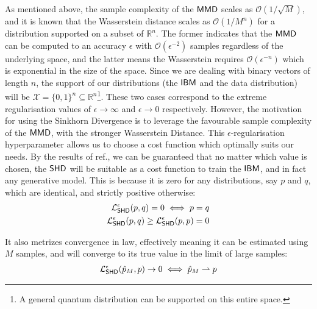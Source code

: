 As mentioned above, the sample complexity of the $\operatorname{\textsf{MMD}}$ scales as $\mathcal{O}(1/\sqrt{M})$, and it is known that the Wasserstein distance scales as $\mathcal{O}(1/M^n)$  for a distribution supported on a subset of $\mathbb{R}^n$. The former indicates that the $\operatorname{\textsf{MMD}}$ can be computed to an accuracy $\epsilon$ with $\mathcal{O}(\epsilon^{-2})$ samples regardless of the underlying space, and the latter means the Wasserstein requires $\mathcal{O}(\epsilon^{-n})$ which is exponential in the size of the space. Since we are dealing with binary vectors of length $n$, the support of our distributions (the $\textsf{IBM}$ and the data distribution) will be $\mathcal{X} = \{0, 1\}^n \subseteq \mathbb{R}^n$\footnote{A general quantum distribution can be supported on this entire space.}. These two cases correspond to the extreme regularisation values of $\epsilon \rightarrow \infty$ and $\epsilon \rightarrow 0$ respectively. However, the motivation for using the Sinkhorn Divergence is to leverage the favourable sample complexity of the $\operatorname{\textsf{MMD}}$, with the stronger Wasserstein Distance. This $\epsilon$-regularisation hyperparameter allows us to choose a cost function which optimally suits our needs. By the results of ref., we can be guaranteed that no matter which value is chosen, the $\operatorname{\textsf{SHD}}$ will be suitable as a cost function to train the $\textsf{IBM}$, and in fact any generative model. This is because it is zero for any distributions, say $p$ and $q$, which are identical, and strictly positive otherwise:
\begin{align}
    \mathcal{L}_{\operatorname{\textsf{SHD}}}^\epsilon(p, q)  = 0 \iff p = q \label{sinkhornzeroiff}\\
    \mathcal{L}_{\operatorname{\textsf{SHD}}}^\epsilon(p, q) \geq \mathcal{L}_{\operatorname{\textsf{SHD}}}^\epsilon(p, p) = 0 \label{sinkhorngreaterzero_supp}
\end{align}


It also metrizes convergence in law, effectively meaning it can be estimated using $M$ samples, and will converge to its true value in the limit of large samples:
\begin{align}
    \mathcal{L}_{\operatorname{\textsf{SHD}}}^\epsilon(\hat{p}_M, p) \rightarrow 0 \iff \hat{p}_M \rightharpoonup p \label{sinkhornconvergenceinlaw_supp}
 \end{align}
 
